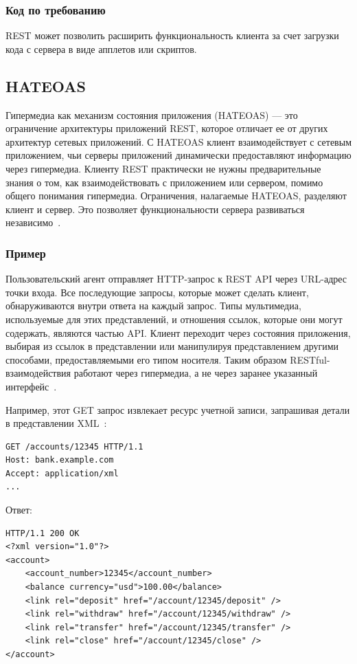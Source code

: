 \documentclass[a4page]{article}
\begin{document}
\subsubsection{Код по требованию}
REST может позволить расширить функциональность клиента за счет загрузки кода с сервера
в виде апплетов или скриптов.

\subsection{HATEOAS}\label{hateoas}
Гипермедиа как механизм состояния приложения (HATEOAS) --- это ограничение архитектуры приложений REST,
которое отличает ее от других архитектур сетевых приложений.
С HATEOAS клиент взаимодействует с сетевым приложением,
чьи серверы приложений динамически предоставляют информацию через гипермедиа.
Клиенту REST практически не нужны предварительные знания о том,
как взаимодействовать с приложением или сервером, помимо общего понимания гипермедиа.
Ограничения, налагаемые HATEOAS, разделяют клиент и сервер.
Это позволяет функциональности сервера развиваться независимо~\cite{rest-of-rest}.

\subsubsection{Пример}
Пользовательский агент отправляет HTTP-запрос к REST API через URL-адрес точки входа.
Все последующие запросы, которые может сделать клиент, обнаруживаются внутри ответа на каждый запрос.
Типы мультимедиа, используемые для этих представлений, и отношения ссылок, которые они могут содержать,
являются частью API. Клиент переходит через состояния приложения,
выбирая из ссылок в представлении или манипулируя представлением другими способами,
предоставляемыми его типом носителя.
Таким образом RESTful-взаимодействия работают через гипермедиа,
а не через заранее указанный интерфейс~\cite{REST-hyper}.

Например, этот GET запрос извлекает ресурс учетной записи,
запрашивая детали в представлении XML~\cite{hateoas}:

\begin{lstlisting}
GET /accounts/12345 HTTP/1.1
Host: bank.example.com
Accept: application/xml
...
\end{lstlisting}

Ответ:

\begin{lstlisting}
HTTP/1.1 200 OK
<?xml version="1.0"?>
<account>
    <account_number>12345</account_number>
    <balance currency="usd">100.00</balance>
    <link rel="deposit" href="/account/12345/deposit" />
    <link rel="withdraw" href="/account/12345/withdraw" />
    <link rel="transfer" href="/account/12345/transfer" />
    <link rel="close" href="/account/12345/close" />
</account>
\end{lstlisting}
\end{document}

